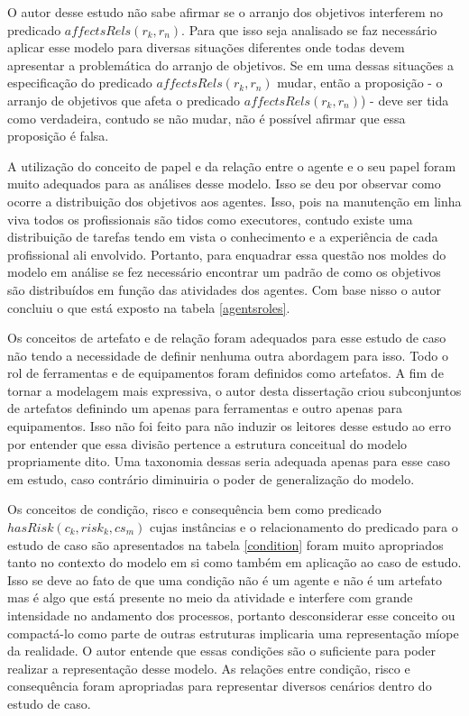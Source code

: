 O autor desse estudo não sabe afirmar se o arranjo dos objetivos interferem no predicado $affectsRels(r_k,r_n)$. Para que isso seja analisado se faz necessário aplicar esse modelo para diversas situações diferentes onde todas devem apresentar a problemática do arranjo de objetivos. Se em uma dessas situações a especificação do predicado $affectsRels(r_k,r_n)$ mudar, então a proposição - o arranjo de objetivos que afeta o predicado $affectsRels(r_k,r_n)$) - deve ser tida como verdadeira, contudo se não mudar, não é possível afirmar que essa proposição é falsa. 

A utilização do conceito de papel e da relação entre o agente e o seu papel foram muito adequados para as análises desse modelo. Isso se deu por observar como ocorre a distribuição dos objetivos aos agentes. Isso, pois na manutenção em linha viva todos os profissionais são tidos como executores, contudo existe uma distribuição de tarefas tendo em vista o conhecimento e a experiência de cada profissional ali envolvido. Portanto, para enquadrar essa questão nos moldes do modelo em análise se fez necessário encontrar um padrão de como os objetivos são distribuídos em função das atividades dos agentes. Com base nisso o autor concluiu o que está exposto na tabela \ref{agentsroles}.

Os conceitos de artefato e de relação foram adequados para esse estudo de caso não tendo a necessidade de definir nenhuma outra abordagem para isso. Todo o rol de ferramentas e de equipamentos foram definidos como artefatos. A fim de tornar a modelagem mais expressiva, o autor desta dissertação criou subconjuntos de artefatos definindo um apenas para ferramentas e outro apenas para equipamentos. Isso não foi feito para não induzir os leitores desse estudo ao erro por entender que essa divisão pertence a estrutura conceitual do modelo propriamente dito. Uma taxonomia dessas seria adequada apenas para esse caso em estudo, caso contrário diminuiria o poder de generalização do modelo. 

Os conceitos de condição, risco e consequência bem como predicado $hasRisk(c_k,risk_k,cs_m)$ cujas instâncias e o relacionamento do predicado para o estudo de caso são apresentados na tabela \ref{condition} foram muito apropriados tanto no contexto do modelo em si como também em aplicação ao caso de estudo. Isso se deve ao fato de que uma condição não é um agente e não é um artefato mas é algo que está presente no meio da atividade e interfere com grande intensidade no andamento dos processos, portanto desconsiderar esse conceito ou compactá-lo como parte de outras estruturas implicaria uma representação míope da realidade. O autor entende que essas condições são o suficiente para poder realizar a representação desse modelo. As relações entre condição, risco e consequência foram apropriadas para representar diversos cenários dentro do estudo de caso. 

